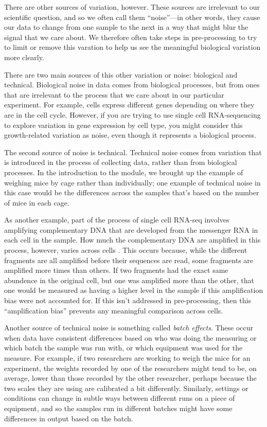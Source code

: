 \documentclass[]{tufte-book}
\begin{document}
There are other sources of variation, however. These sources are irrelevant to
our scientific question, and so we often call them ``noise''---in other words,
they cause our data to change from one sample to the next in a way that might
blur the signal that we care about. We therefore often take steps in
pre-processing to try to limit or remove this varation to help us see the
meaningful biological variation more clearly.

There are two main sources of this other variation or noise: biological and
technical. Biological noise in data comes from biological processes, but from
ones that are irrelevant to the process that we care about in our particular
experiment. For example, cells express different genes depending on where they
are in the cell cycle. However, if you are trying to use single cell
RNA-sequencing to explore variation in gene expression by cell type, you might
consider this growth-related variation as noise, even though it represents a
biological process.

The second source of noise is technical. Technical noise comes from variation
that is introduced in the process of collecting data, rather than from
biological processes. In the introduction to the module, we brought up the
example of weighing mice by cage rather than individually; one example of
technical noise in this case would be the differences across the samples that's
based on the number of mice in each cage.

As another example, part of the process of single cell RNA-seq involves
amplifying complementary DNA that are developed from the messenger RNA in each
cell in the sample. How much the complementary DNA are amplified in this
process, however, varies across cells \citep{perkel2017single}. This occurs because,
while the different fragments are all amplified before their sequences are read,
some fragments are amplified more times than others. If two fragments had the
exact same abundence in the original cell, but one was amplified more than the
other, that one would be measured as having a higher level in the sample if this
amplification bias were not accounted for. If this isn't addressed in
pre-processing, then this ``amplification bias'' prevents any meaningful comparison
across cells.

Another source of technical noise is something called \emph{batch effects}. These
occur when data have consistent differences based on who was doing the measuring
or which batch the sample was run with, or which equipment was used for the
measure. For example, if two researchers are
working to weigh the mice for an experiment, the weights recorded by one of the
researchers might tend to be, on average, lower than those recorded by the other
researcher, perhaps because the two scales they are using are calibrated a bit
differently. Similarly, settings or conditions can change in subtle ways between
different runs on a piece of equipment, and so the samples run in different
batches might have some differences in output based on the batch.
\end{document}
